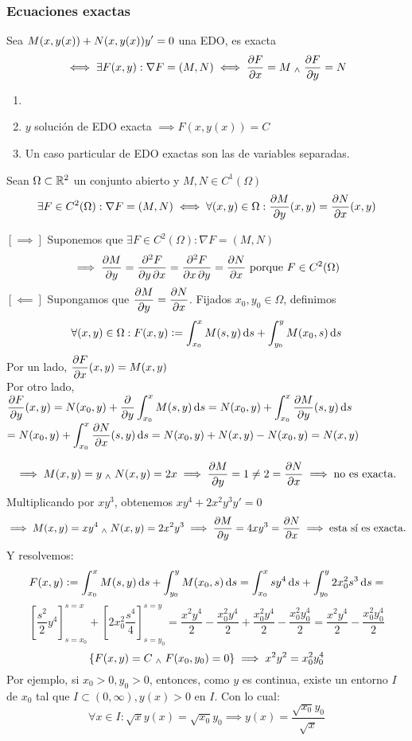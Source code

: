 \documentclass[12pt]{article}
\begin{document}
\subsubsection{Ecuaciones exactas}
\begin{defn}
    Sea $\displaystyle M(x, y(x))+N(x, y(x))y'=0$ una EDO, es exacta
    \[\iff \exists F(x, y) : \nabla F=(M, N) \iff \pdv{F}{x}=M \; _{\wedge} \; \pdv{F}{y}=N\] 
\end{defn}
\begin{obs}
    \begin{enumerate}[topsep=0pt, itemsep=1pt,parsep=3pt]
        \item[] 
        \item $y$ solución de EDO exacta $\implies F(x, y(x))=C$
        \item Un caso particular de EDO exactas son las de variables separadas.
    \end{enumerate}
\end{obs}

\begin{prop}
    Sean $\Omega\subset \mathbb{R}^2$ un conjunto abierto y $M, N \in C^1(\Omega)$
    \[\exists F \in C^2(\Omega) : \nabla F=(M,N) \iff \forall (x,y) \in \Omega :\pdv{M}{y}(x,y)=\pdv{N}{x}(x,y)\]
    \begin{dem}
        $[\implies]$ Suponemos que $\exists F \in C^2(\Omega):\nabla F = (M, N)$
        \[\implies \pdv{M}{y}=\pdv{F}{y, x}=\pdv{F}{x, y}=\pdv{N}{x} \text{ porque } F \in C^2(\Omega) \]
        $[\impliedby]$ Supongamos que $\displaystyle\pdv{M}{y}=\pdv{N}{x}$. Fijados $x_0, y_0 \in \Omega$, definimos
        \[\forall (x, y) \in \Omega : F(x, y)\defeq \int_{x_0}^xM(s,y)\odif{s}+\int_{y_0}^yM(x_0,s)\odif{s}\]
        Por un lado, $\displaystyle \pdv{F}{x}(x,y)=M(x,y)$ \\
        Por otro lado, $\ds \pdv{F}{y}(x, y)=N(x_0, y) + \pdv{}{y} \int_{x_0}^x M(s,y) \odif{s} = N(x_0, y)+\int_{x_0}^x \pdv{M}{y}(s,y)\odif{s}$
        $\ds= N(x_0, y)+\int_{x_0}^x \pdv{N}{x}(s,y)\odif{s}=N(x_0, y)+N(x,y)-N(x_0, y)=N(x,y)$
    \end{dem}
\end{prop}

\begin{ejem}[$y+2xy'=0$]
    \[\implies M(x, y)=y \; _{\wedge} \; N(x,y) = 2x \implies \pdv{M}{y}=1 \ne 2 = \pdv{N}{x} \implies \text{no es exacta.}\]
    Multiplicando por $xy^3$, obtenemos $xy^4+2x^2y^3y'=0$
    \[\implies M(x, y)=xy^4 \; _{\wedge} \; N(x,y)=2x^2y^3 \implies \pdv{M}{y}=4xy^3 = \pdv{N}{x}\implies \text{esta sí es exacta.}\]
    Y resolvemos:
    \[F(x, y)\defeq \int_{x_0}^xM(s,y)\odif{s}+\int_{y_0}^yM(x_0,s)\odif{s} = \int_{x_0}^xsy^4\odif{s}+\int_{y_0}^y2x_0^2s^3\odif{s}=\]
    \[\left[\frac{s^2}{2}y^4\right]_{s=x_0}^{s=x} + \left[2x_0^2\frac{s^4}{4}\right]_{s=y_0}^{s=y}=\frac{x^2y^4}{2}-\frac{x_0^2y^4}{2}+\frac{x_0^2y^4}{2}-\frac{x_0^2y_0^4}{2}=\frac{x^2y^4}{2}-\frac{x_0^2y_0^4}{2}\]
    \[\{F(x,y)=C \; _{\wedge} \; F(x_0, y_0)=0\} \implies x^2y^2=x_0^2y_0^4\]
    Por ejemplo, si $x_0>0, y_0>0$, entonces, como $y$ es continua, existe un entorno $I$ de $x_0$ tal que $I\subset (0, \infty), y(x)>0$ en $I$. Con lo cual:
    \[\forall x \in I : \sqrt{x}y(x)=\sqrt{x_0}y_0 \implies \boxed{y(x)=\frac{\sqrt{x_0}y_0}{\sqrt{x}}}\]
\end{ejem}
\end{document}
